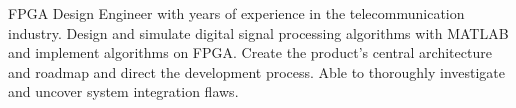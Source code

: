 \setcounter{experience_years}{\year}
\addtocounter{experience_years}{-2013}

\par{
    FPGA Design Engineer with \the\value{experience_years}{\small +} years of experience
    in the telecommunication industry.
    Design and simulate digital signal processing algorithms with MATLAB and implement
    algorithms on FPGA. Create the product's central architecture and roadmap and direct
    the development process. Able to thoroughly investigate and uncover system integration flaws.
}

